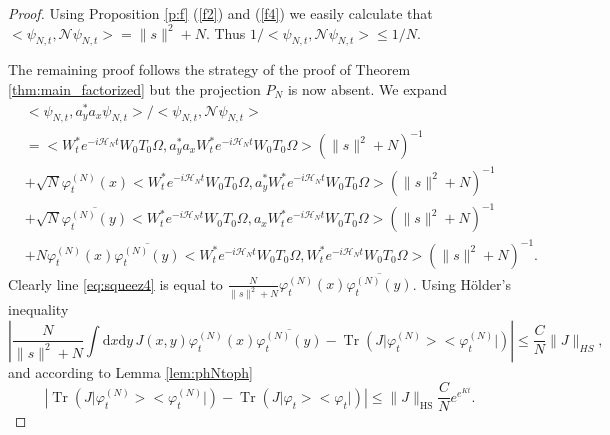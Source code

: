 \documentclass[11pt,a4paper,draft,DIV11]{scrartcl}	%
\newcommand{\di}{\textrm{d}}		%
\newcommand{\Ncal}{\mathcal{N}}		%
\newcommand{\Hcal}{\mathcal{H}}		%
\newcommand{\scal}[2]{\big<#1,#2\big>} %
\newcommand{\cc}[1]{\overline{#1}}	%
\newcommand{\norm}[1]{\lVert#1\rVert}	%
\newcommand{\ph}{\varphi_t^{(N)}}	%
\newcommand{\project}[1]{\lvert #1 \big>\big< #1\rvert}	%
\newcommand{\Tr}{\operatorname{Tr}}	%
\newcommand{\bd}{\begin{displaymath}}			%
\newcommand{\ed}{\end{displaymath}}
\begin{document}
\begin{proof}
Using Proposition \ref{p:f} (\ref{f2}) and (\ref{f4}) we easily calculate that $\scal{\psi_{N,t}}{\Ncal \psi_{N,t}} = \norm{s}^2 + N$. Thus $1/\scal{\psi_{N,t}}{\Ncal \psi_{N,t}} \leq 1/N$.

The remaining proof follows the strategy of the proof of Theorem \ref{thm:main_factorized} but the projection $P_N$ is now absent. We expand
\begin{align}
& \scal{\psi_{N,t}}{a^\ast_y a_x \psi_{N,t}}/\scal{\psi_{N,t}}{\Ncal \psi_{N,t}} \nonumber \\
& = \scal{W^\ast_t e^{-i \Hcal_N t} W_0 T_0 \Omega}{a^\ast_y a_x W^\ast_t e^{-i\Hcal_N t} W_0 T_0 \Omega}\left(\norm{s}^2 + N\right)^{-1} \label{eq:squeez1} \\
& + \sqrt{N} \ph(x) \scal{W^\ast_t e^{-i\Hcal_N t} W_0 T_0 \Omega}{a^\ast_y W^\ast_t e^{-i \Hcal_N t} W_0 T_0 \Omega}\left(\norm{s}^2 + N\right)^{-1} \label{eq:squeez3}\\
& + \sqrt{N} \cc{\ph(y)} \scal{W^\ast_t e^{-i\Hcal_N t} W_0 T_0 \Omega}{a_x W^\ast_t e^{-i \Hcal_N t} W_0 T_0 \Omega} \left(\norm{s}^2 + N\right)^{-1} \label{eq:squeez2}\\
& + N \ph(x) \cc{\ph(y)} \scal{W^\ast_t e^{-i\Hcal_N t} W_0 T_0 \Omega}{W^\ast_t e^{-i\Hcal_N t} W_0 T_0 \Omega}\left(\norm{s}^2 + N\right)^{-1}. \label{eq:squeez4}
\end{align}
Clearly line \eqref{eq:squeez4} is equal to $\frac{N}{\norm{s}^2+N} \ph(x) \cc{\ph(y)}$. Using H\"older's inequality
\[
\left\lvert \frac{N}{\norm{s}^2+N} \int \di x \di y\, J(x,y) \ph(x) \cc{\ph(y)} - \Tr\left( J \project{\ph}  \right) \right\rvert \leq \frac{C}{N} \norm{J}_{HS},
\]
and according to Lemma \ref{lem:phNtoph}
\bd
\left\lvert \Tr\left(J \project{\ph}\right) - \Tr\left(J \project{\varphi_t}\right) \right\rvert \leq \norm{J}_{\textrm{HS}} \frac{C}{N} e^{e^{Kt}}.
\ed


\end{proof}
\end{document}
